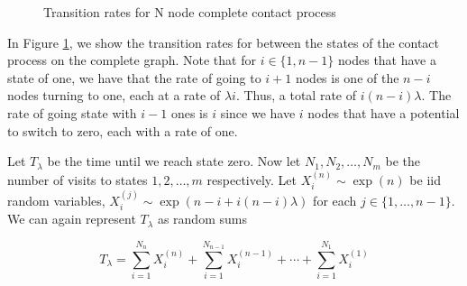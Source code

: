 \documentclass{article}
\theoremstyle{plain}
\theoremstyle{definition}
\theoremstyle{remark}
\begin{document}
\begin{figure}
    \centering
    \caption{Transition rates for N node complete contact process}
    \label{fig:complete_contact_n_node_rates}
\end{figure}

In Figure \ref{fig:complete_contact_n_node_rates}, we show the transition rates for between the states of the contact process on the complete graph.
Note that for $i \in \{1, n - 1\} $ nodes that have a state of one, we have that the rate of going to $i + 1$ nodes is one of the $n - i$ nodes turning to one, each at a rate of $\lambda i$.
Thus, a total rate of $i (n - i) \lambda$.
The rate of going state with $i - 1$ ones is $i$ since we have $i$ nodes that have a potential to switch to zero, each with a rate of one.

Let $T_\lambda$ be the time until we reach state zero.
Now let $N_1, N_2, \ldots, N_m$ be the number of visits to states $1, 2, \ldots, m$ respectively.
Let $X_i^{(n)} \sim \exp(n)$ be iid random variables, $X_i^{(j)} \sim \exp(n - i + i(n - i)\lambda)$ for each $j \in \{1, \ldots, n-1\}$.
We can again represent $T_\lambda$ as random sums

\begin{equation}\label{eq:wait_contact_sum}
    T_\lambda = \sum_{i = 1}^{N_n} X_i^{(n)} + \sum_{i = 1}^{N_{n - 1}} X_i^{(n - 1)} + \cdots + \sum_{i = 1}^{N_1} X_i^{(1)}
\end{equation}
\end{document}
